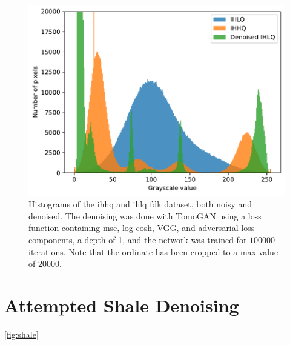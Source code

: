 \begin{figure}[htbp]
  \centering
  \includegraphics[width=.85\textwidth]{figures/kimroberthist.pdf}
  \caption[Histograms of IHHQ and IHLQ, noisy and denoised]{Histograms of the \acrshort{ihhq} and \acrshort{ihlq} \acrshort{fdk} dataset, both noisy and denoised. The denoising was done with TomoGAN using a loss function containing \acrshort{mse}, log-cosh, VGG, and adversarial loss components, a depth of 1, and the network was trained for $100 000$ iterations. Note that the ordinate has been cropped to a max value of $20000$. }
  \label{fig:kimroberthist}
\end{figure}

\section{Attempted Shale Denoising}
\cref{fig:shale}

